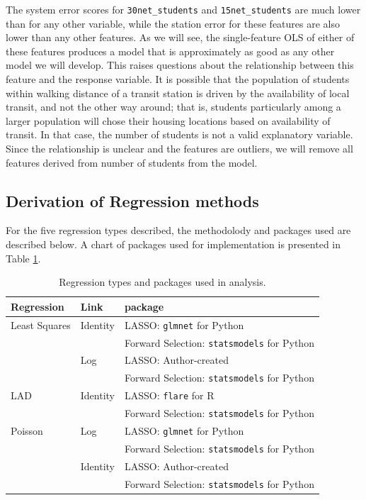 \documentclass[11pt]{article}
\begin{document}
The system error scores for \texttt{30net\_students} and \texttt{15net\_students} are much lower than for any other variable, while the station error for these features are also lower than any other features. As we will see, the single-feature OLS of either of these features produces a model that is approximately as good as any other model we will develop. This raises questions about the relationship between this feature and the response variable. It is possible that the population of students within walking distance of a transit station is driven by the availability of local transit, and not the other way around; that is, students particularly among a larger population will chose their housing locations based on availability of transit. In that case, the number of students is not a valid explanatory variable. Since the relationship is unclear and the features are outliers, we will remove all features derived from number of students from the model.



\subsection{Derivation of Regression methods}
For the five regression types described, the methodolody and packages used are described below. A chart of packages used for implementation is presented in Table \ref{tab:regtype}.

\begin{table} [H]
\centering
\begin{tabular}{lll}
\toprule Regression&Link&package\\
\midrule Least Squares&Identity&LASSO: \texttt{glmnet} for Python\\
&&Forward Selection: \texttt{statsmodels} for Python\\
&Log&LASSO: Author-created\\
&&Forward Selection: \texttt{statsmodels} for Python\\
LAD&Identity&LASSO: \texttt{flare} for R\\
&&Forward Selection: \texttt{statsmodels} for Python\\
Poisson&Log&LASSO: \texttt{glmnet} for Python\\
&&Forward Selection: \texttt{statsmodels} for Python\\
&Identity&LASSO: Author-created\\
&&Forward Selection: \texttt{statsmodels} for Python\\
\bottomrule
\end{tabular}
\caption{Regression types and packages used in analysis.}
\label{tab:regtype}
\end{table}
\end{document}
